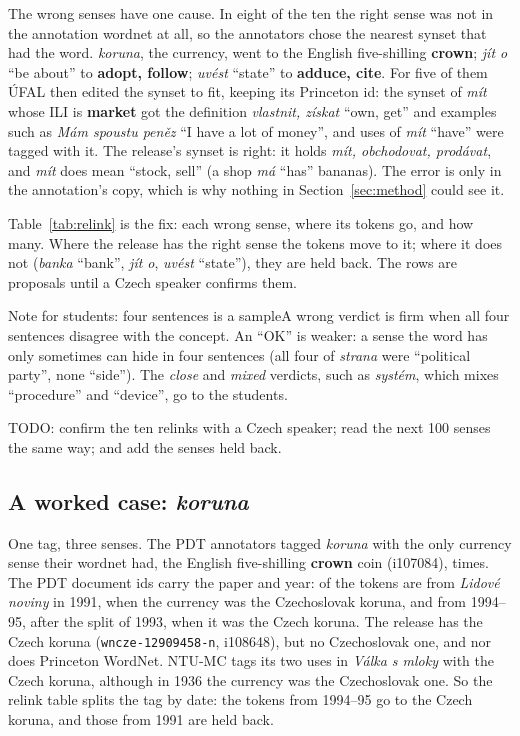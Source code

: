 \documentclass[a4paper,12pt]{article}
\newcommand{\aside}[2]{\begin{asidebox}{#1}\small #2\end{asidebox}}
\begin{document}
The wrong senses have one cause.  In eight of the ten the right sense was
not in the annotation wordnet at all, so the annotators chose the nearest
synset that had the word.  \textit{koruna}, the currency, went to the
English five-shilling \textbf{crown}; \textit{jít o} ``be about'' to
\textbf{adopt, follow}; \textit{uvést} ``state'' to \textbf{adduce,
cite}.  For five of them ÚFAL then edited the synset to fit, keeping its
Princeton id: the synset of \textit{mít} whose ILI is \textbf{market}
got the definition \textit{vlastnit, získat} ``own, get'' and examples
such as \textit{Mám spoustu peněz} ``I have a lot of money'', and
 uses of \textit{mít} ``have'' were tagged
with it.  The release's synset is right: it holds \textit{mít,
obchodovat, prodávat}, and \textit{mít} does mean ``stock, sell'' (a shop
\textit{má} ``has'' bananas).  The error is only in the annotation's
copy, which is why nothing in Section~\ref{sec:method} could see it.

Table~\ref{tab:relink} is the fix: each wrong sense, where its tokens go,
and how many.  Where the release has the right sense the tokens move to
it; where it does not (\textit{banka} ``bank'', \textit{jít o},
\textit{uvést} ``state''), they are held back.  The rows are proposals
until a Czech speaker confirms them.

\aside{Note for students: four sentences is a sample}{A wrong verdict is
firm when all four sentences disagree with the concept.  An ``OK'' is
weaker: a sense the word has only sometimes can hide in four sentences
(all four of \textit{strana} were ``political party'', none ``side'').
The \emph{close} and \emph{mixed} verdicts, such as \textit{systém}, which
mixes ``procedure'' and ``device'', go to the students.}

TODO: confirm the ten relinks with a Czech speaker; read the next 100
senses the same way; and add the senses held back.

\subsection{A worked case: \textit{koruna}}
\label{app:koruna}

One tag, three senses.  The PDT annotators tagged \textit{koruna} with
the only currency sense their wordnet had, the English five-shilling
\textbf{crown} coin (i107084),  times.  The PDT
document ids carry the paper and year: 
of the tokens are from \textit{Lidové noviny} in 1991, when the currency
was the Czechoslovak koruna, and  from
1994--95, after the split of 1993, when it was the Czech koruna.  The
release has the Czech koruna (\texttt{wncze-12909458-n}, i108648), but no
Czechoslovak one, and nor does Princeton WordNet.  NTU-MC tags its two
uses in \textit{Válka s mloky} with the Czech koruna, although in 1936 the
currency was the Czechoslovak one.  So the relink table splits the tag by
date: the tokens from 1994--95 go to the Czech koruna, and those from
1991 are held back.
\end{document}

